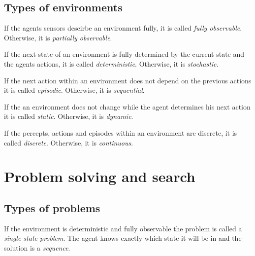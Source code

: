 \documentclass{article}
\begin{document}
\subsection{Types of environments}

\begin{definition}
    If the agents sensors descirbe an environment fully, it is called
    \emph{fully observable}. Otherwise, it is \emph{partially observable}.
\end{definition}

\begin{definition}
    If the next state of an environment is fully determined by the current state
    and the agents actions, it is called \emph{deterministic}. Otherwise, it is
    \emph{stochastic}.
\end{definition}

\begin{definition}
    If the next action within an environment does not depend on the previous actions
    it is called \emph{episodic}. Otherwise, it is \emph{sequential}.
\end{definition}

\begin{definition}
    If the an environment does not change while the agent determines his next action
    it is called \emph{static}. Otherwise, it is \emph{dynamic}.
\end{definition}

\begin{definition}
    If the percepts, actions and episodes within an environment are discrete, it is called
    \emph{discrete}. Otherwise, it is \emph{continuous}.
\end{definition}


\section{Problem solving and search}


\subsection{Types of problems}

\begin{definition}
    If the environment is deterministic and fully observable
    the problem is called a \emph{single-state problem}.
    The agent knows exactly which state it will be in and the
    solution is a \emph{sequence}.
\end{definition}
\end{document}
